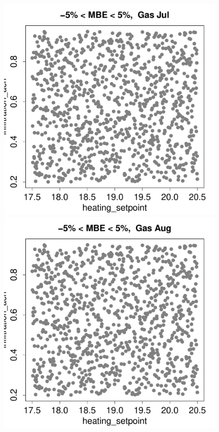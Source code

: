 \documentclass[a4paper, 12pt]{article}
\begin{document}
\begin{figure}
 \includegraphics[width=\scale]{MBE/SelectedMBE_Gas_07.pdf}
 \includegraphics[width=\scale]{MBE/SelectedMBE_Gas_08.pdf}

\end{figure}
\end{document}
